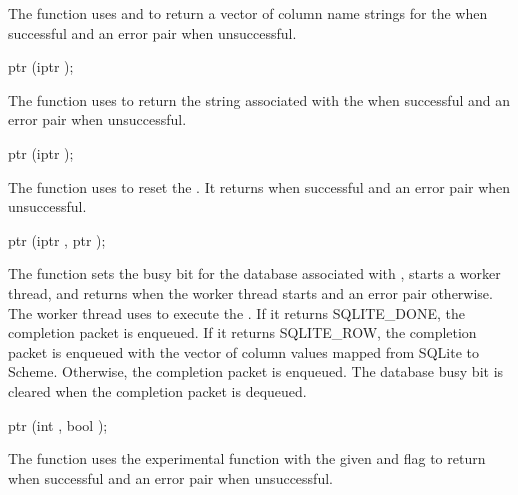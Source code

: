 The  function uses
 and  to
return a vector of column name strings for the  when
successful and an error pair when unsuccessful.

\begin{function}
  ptr (iptr );
\end{function}\antipar

The  function uses 
to return the  string associated with the 
when successful and an error pair when unsuccessful.

\begin{function}
  ptr (iptr );
\end{function}\antipar

The  function uses 
to reset the . It returns  when
successful and an error pair when unsuccessful.

\begin{function}
  ptr (iptr , ptr );
\end{function}\antipar

The  function sets the busy bit for the
database associated with , starts a worker thread, and
returns  when the worker thread starts and an error pair
otherwise. The worker thread uses  to execute
the . If it returns SQLITE\_DONE, the completion packet
 is enqueued. If it returns SQLITE\_ROW,
the completion packet 
is enqueued with the vector of column values mapped from SQLite to
Scheme. Otherwise, the completion packet  is enqueued. The database busy bit is cleared
when the completion packet is dequeued.

\begin{function}
  ptr (int , bool );
\end{function}\antipar

The  function uses the experimental
 function with the given  and
 flag to return 
when successful and an error pair when unsuccessful.

